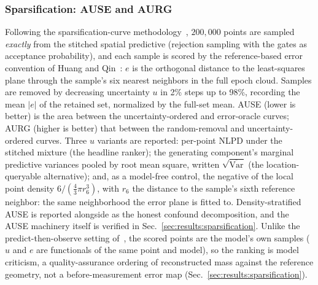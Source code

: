 \subsubsection{Sparsification: AUSE and AURG}
 Following the sparsification-curve
methodology~\cite{ilg2018uncertainty,poggi2020uncertainty}, $200{,}000$
points are sampled \emph{exactly} from the stitched spatial predictive
(rejection sampling with the gates as acceptance probability), and each sample is
scored by the reference-based error convention of Huang and
Qin~\cite{huang2025uncertainty}: $e$ is the orthogonal distance to the
least-squares plane through the sample's six nearest neighbors in the
full epoch cloud. Samples are removed by decreasing uncertainty $u$ in
2\% steps up to 98\%, recording the mean $|e|$ of the retained set,
normalized by the full-set mean. AUSE (lower is better) is the area
between the uncertainty-ordered and error-oracle curves; AURG (higher
is better) that between the random-removal and uncertainty-ordered
curves. Three $u$ variants are reported: per-point NLPD under the
stitched mixture (the headline ranker); the generating component's
marginal predictive variances pooled by root mean square, written
$\sqrt{\overline{\mathrm{Var}}}$ (the location-queryable
alternative); and, as a model-free control, the negative of the local
point density $6/(\tfrac{4}{3}\pi r_6^{3})$, with $r_6$ the distance to the
sample's sixth reference neighbor: the same neighborhood the error
plane is fitted to. Density-stratified AUSE is reported alongside as
the honest confound decomposition, and the AUSE machinery
itself is verified in Sec.~\ref{sec:results:sparsification}. Unlike
the predict-then-observe setting
of~\cite{ilg2018uncertainty,poggi2020uncertainty}, the scored points
are the model's own samples ($u$ and $e$ are functionals of the
same point and model), so the ranking is model criticism, a
quality-assurance ordering of reconstructed mass against the reference
geometry, not a before-measurement error map
(Sec.~\ref{sec:results:sparsification}).

